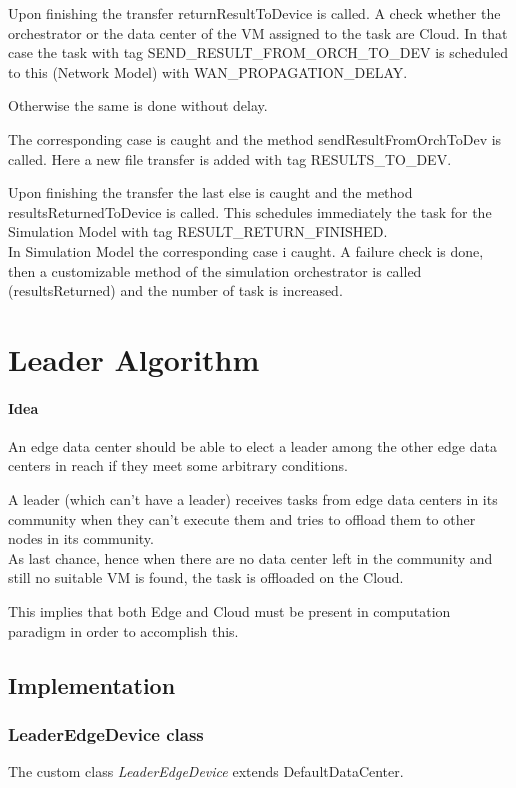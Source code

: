 \documentclass[12pt]{report}
\begin{document}
Upon finishing the transfer returnResultToDevice is called.
A check whether the orchestrator or the data center of the VM assigned to the task are Cloud. In that case the task with tag SEND\_RESULT\_FROM\_ORCH\_TO\_DEV is scheduled to this (Network Model) with WAN\_PROPAGATION\_DELAY.

Otherwise the same is done without delay.

The corresponding case is caught and the method sendResultFromOrchToDev is called. Here a new file transfer is added with tag RESULTS\_TO\_DEV.

Upon finishing the transfer the last else is caught and the method \mbox{resultsReturnedToDevice} is called. This schedules immediately the task for the Simulation Model with tag RESULT\_RETURN\_FINISHED.
\\
In Simulation Model the corresponding case i caught. A failure check is done, then a customizable method of the simulation orchestrator is called (resultsReturned) and the number of task is increased.

\section{Leader Algorithm}
\label{leader algo}
\paragraph*{Idea}
An edge data center should be able to elect a leader among the other edge data centers in reach if they meet some arbitrary conditions.

A leader (which can't have a leader) receives tasks from edge data centers in its community when they can't execute them and tries to offload them to other nodes in its community.\\

As last chance, hence when there are no data center left in the community and still no suitable VM is found, the task is offloaded on the Cloud.

This implies that both Edge and Cloud must be present in computation paradigm in order to accomplish this.

\subsection*{Implementation}

\subsubsection*{LeaderEdgeDevice class}
The custom class \textit{LeaderEdgeDevice} extends DefaultDataCenter.
\end{document}
